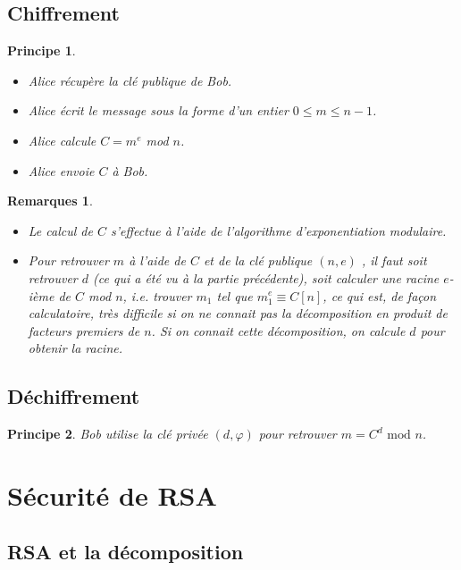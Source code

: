 \documentclass[12pt]{report}
\newtheorem*{rems}{Remarques}
\newtheorem*{prin}{Principe}
\begin{document}
\subsection{Chiffrement}

\begin{prin}\
\begin{itemize}
\item[•] Alice récupère la clé publique de Bob.
\item[•] Alice écrit le message sous la forme d'un entier $0 \leq m \leq n-1$.
\item[•] Alice calcule $C=m^e$ mod $n$.
\item[•] Alice envoie $C$ à Bob.
\end{itemize}
\end{prin}

\begin{rems}\
\begin{itemize}
\item[•] Le calcul de $C$ s'effectue à l'aide de l'algorithme d'exponentiation modulaire.
\item[•] Pour retrouver $m$ à l'aide de $C$ et de la clé publique $(n,e)$ , il faut soit retrouver $d$ (ce qui a été vu à la partie précédente), soit calculer une racine $e$-ième de $C$ mod $n$, i.e. trouver $m_1$ tel que $m_1^e \equiv C [n]$, ce qui est, de façon calculatoire, très difficile si on ne connait pas la décomposition en produit de facteurs premiers de $n$. Si on connait cette décomposition, on calcule $d$ pour obtenir la racine. 
\end{itemize}
\end{rems}

\subsection{Déchiffrement}

\begin{prin}
Bob utilise la clé privée $(d,\varphi)$ pour retrouver $m=C^d \text{ mod } n$.
\end{prin}

\section{Sécurité de RSA}

\subsection{RSA et la décomposition}
\end{document}

